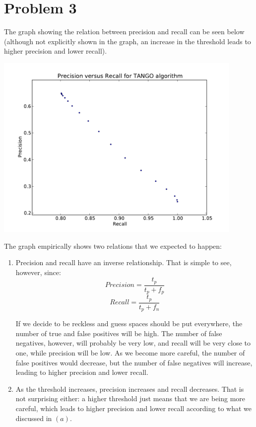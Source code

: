\documentclass[112pt]{article}
\begin{document}
\section*{Problem 3}
The graph showing the relation between precision and recall can be seen below (although not explicitly shown in the graph, an increase in the threshold leads to higher precision and lower recall).
\begin{center}
\includegraphics[width=120mm]{graph.pdf}
\end{center}

The graph empirically shows two relations that we expected to happen:
\begin{enumerate}
\item Precision and recall have an inverse relationship. That is simple to see, however, since:
$$Precision = \frac{t_p}{t_p+f_p}$$
$$Recall = \frac{t_p}{t_p+f_n}$$

If we decide to be reckless and guess spaces should be put everywhere, the number of true and false positives will be high. The number of false negatives, however, will probably be very low, and recall will be very close to one, while precision will be low. As we become more careful, the number of false positives would decrease, but the number of false negatives will increase, leading to higher precision and lower recall.

\item
As the threshold increases, precision increases and recall decreases. That is not surprising either: a higher threshold just means that we are being more careful, which leads to higher precision and lower recall according to what we discussed in $(a)$.
\end{enumerate}
\end{document}
